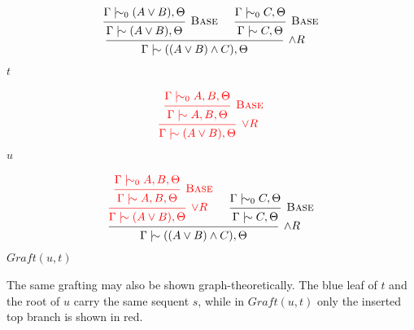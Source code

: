 \documentclass[11pt]{article}
\newcommand{\ms}{\mathrel{\mid\!\sim}}
\newcommand{\mszero}{\mathrel{\mid\!\sim_{0}}}
\newcommand{\Graft}{\mathit{Graft}}
\begin{document}
\begin{center}
\begin{minipage}{0.42\textwidth}
\centering
\[
\begin{prooftree}
\hypo{\Gamma \mszero (A\vee B),\Theta}
\infer1[\textsc{Base}]{\Gamma \ms (A\vee B),\Theta}
\hypo{\Gamma \mszero C,\Theta}
\infer1[\textsc{Base}]{\Gamma \ms C,\Theta}
\infer2[\(\wedge R\)]{\Gamma \ms ((A\vee B)\wedge C),\Theta}
\end{prooftree}
\]
\small \(t\)
\end{minipage}
\hfill
\begin{minipage}{0.32\textwidth}
\centering
\[
\begin{prooftree}
\hypo{\Gamma \mszero A,B,\Theta}
\infer1[\textsc{Base}]{\Gamma \ms A,B,\Theta}
\infer1[\(\vee R\)]{\Gamma \ms (A\vee B),\Theta}
\rewrite{\color{red}\box\treebox}
\end{prooftree}
\]
\small \(u\)
\end{minipage}
\end{center}

\begin{center}
\[
\begin{prooftree}
\hypo{\Gamma \mszero A,B,\Theta}
\infer1[\textsc{Base}]{\Gamma \ms A,B,\Theta}
\infer1[\(\vee R\)]{\Gamma \ms (A\vee B),\Theta}
\rewrite{\color{red}\box\treebox}
\hypo{\Gamma \mszero C,\Theta}
\infer1[\textsc{Base}]{\Gamma \ms C,\Theta}
\infer2[\(\wedge R\)]{\Gamma \ms ((A\vee B)\wedge C),\Theta}
\end{prooftree}
\]
\small \(\Graft(u,t)\)
\end{center}

\medskip

\noindent The same grafting may also be shown graph-theoretically. The blue
leaf of \(t\) and the root of \(u\) carry the same sequent \(s\), while in
\(\Graft(u,t)\) only the inserted top branch is shown in red.
\end{document}
